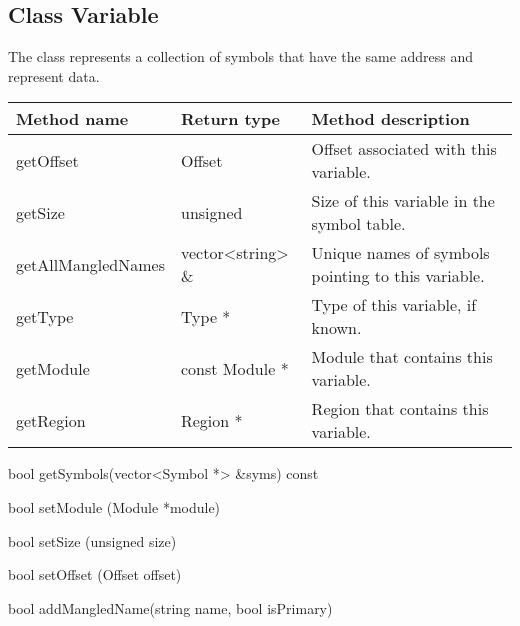\subsection{Class Variable}

The  class represents a collection of symbols that have the same address and represent data. 

\begin{tabular}{p{1.25in}p{1.125in}p{3.125in}}
	Method name & Return type & Method description \\
	\hline
	getOffset & Offset & Offset associated with this variable. \\
	getSize & unsigned & Size of this variable in the symbol table. \\
	getAllMangledNames & vector<string> \& & Unique names of symbols pointing to this variable. \\
	getType & Type * & Type of this variable, if known. \\
	getModule & const Module * & Module that contains this variable. \\
	getRegion & Region * & Region that contains this variable. \\
\end{tabular}

\begin{apient}
bool getSymbols(vector<Symbol *> &syms) const
\end{apient}

\begin{apient}
bool setModule (Module *module)
\end{apient}

\begin{apient}
bool setSize (unsigned size)
\end{apient}

\begin{apient}
bool setOffset (Offset offset)
\end{apient}

\begin{apient}
bool addMangledName(string name, bool isPrimary)
\end{apient}

